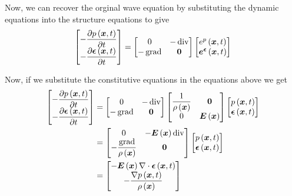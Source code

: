 Now, we can recover the orginal wave equation by substituting the dynamic equations into the structure equations to give
\begin{equation}
  \begin{bmatrix}
    - \dfrac{\partial  p\left(  \boldsymbol{x} ,t \right) }{\partial t}  \\
    - \dfrac{\partial   \boldsymbol{\epsilon} \left(  \boldsymbol{x} ,t \right) }{\partial t}       
  \end{bmatrix}=\begin{bmatrix}
     0 & -\operatorname{div} \\
    -\operatorname{grad} &  \boldsymbol{0} 
  \end{bmatrix}\begin{bmatrix}
     e^{p}\left(  \boldsymbol{x} ,t \right)  \\
      \boldsymbol{e} ^{ \boldsymbol{\epsilon} }\left(  \boldsymbol{x} ,t \right) 
  \end{bmatrix}
\end{equation}

Now, if we substitute the constitutive equations in the equations above we get
\begin{align}
  \begin{bmatrix}
    -\delby{\fnof{p}{\vectr{x},t}}{t} \\
    -\delby{\fnof{\vectr{\epsilon}}{\vectr{x},t}}{t}      
  \end{bmatrix}&=\begin{bmatrix}
     0 & -\divop \\
    -\gradop & \vectr{0}
  \end{bmatrix}\begin{bmatrix}
    \dfrac{1}{\fnof{\rho}{\vectr{x}}} & \vectr{0} \\
    0 & \fnof{\vectr{E}}{\vectr{x}}
  \end{bmatrix}\begin{bmatrix}
    \fnof{p}{\vectr{x},t} \\
    \fnof{\vectr{\epsilon}}{\vectr{x},t}
  \end{bmatrix} \\
  &=\begin{bmatrix}
     0 & -\fnof{\vectr{E}}{\vectr{x}}\divop \\
    -\dfrac{\gradop}{\fnof{\rho}{\vectr{x}}} & \vectr{0}
  \end{bmatrix}\begin{bmatrix}
    \fnof{p}{\vectr{x},t} \\
    \fnof{\vectr{\epsilon}}{\vectr{x},t}
  \end{bmatrix} \\
  &=\begin{bmatrix}
    -\fnof{\vectr{E}}{\vectr{x}}\divergence{}{\fnof{\vectr{\epsilon}}{\vectr{x},t}} \\
    -\dfrac{\gradient{}{\fnof{p}{\vectr{x},t}}}{\fnof{\rho}{\vectr{x}}}
  \end{bmatrix}
\end{align}

